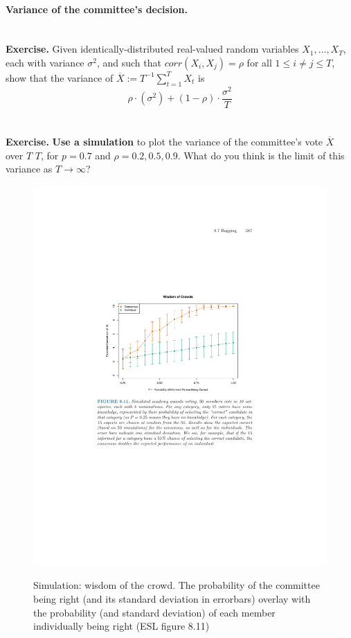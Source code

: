 \paragraph{Variance of the committee's decision.} 
~\\
{\bf Exercise.} Given identically-distributed real-valued 
random variables $X_1,\ldots,X_T$, each with variance $\sigma^2$, and such that
$corr(X_i,X_j)=\rho$ for all $1\leq i\neq j\leq T$, show that the
variance of $\overline{X}:=T^{-1}\sum_{t=1}^T X_t$ is 
\[\rho\cdot(\sigma^2) + (1-\rho)\cdot \frac{\sigma^2}{T}
\]
\\~\\
  {\bf Exercise.} 
  {\bf Use a simulation} to plot the variance of the committee's vote $\overline{X}$ 
over $T$ 
 $T$, for $p=0.7$ 
  and $\rho=0.2, 0.5, 0.9$. What do you think is the limit of this variance as $T\to\infty$? 




  \begin{figure}[H]
  \centering
  \includegraphics[width=4.5in]{crowds.pdf}  \\
  \caption{Simulation: wisdom of the crowd. The probability of the committee
    being right (and its standard deviation in errorbars) 
    overlay with the probability (and standard deviation) of each member individually being
right (ESL figure 8.11)}
\label{fig:crowds}
\end{figure}


